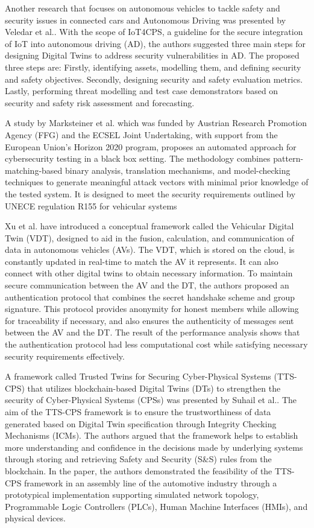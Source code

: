 Another research that focuses on autonomous vehicles to tackle safety and security issues in connected cars and Autonomous Driving was presented by Veledar et al.\cite{veledarDigitalTwinsDependability2019}.
With the scope of IoT4CPS, a guideline for the secure integration of IoT into autonomous driving (AD), the authors suggested three main steps for designing Digital Twins to address security vulnerabilities in AD. The proposed three steps are: Firstly, identifying assets, modelling them, and defining security and safety objectives. Secondly, designing security and safety evaluation metrics. Lastly, performing threat modelling and test case demonstrators based on security and safety risk assessment and forecasting.

A study by Marksteiner et al. \cite{marksteinerUsingCyberDigital2021} which was funded by Austrian Research Promotion Agency (FFG) and the ECSEL Joint Undertaking, with support from the European Union's Horizon 2020 program, proposes an automated approach for cybersecurity testing in a black box setting. The methodology combines pattern-matching-based binary analysis, translation mechanisms, and model-checking techniques to generate meaningful attack vectors with minimal prior knowledge of the tested system. It is designed to meet the security requirements outlined by UNECE regulation R155 for vehicular systems  

Xu et al.\cite{xuEfficientAuthenticationVehicular2021} have introduced a conceptual framework called the Vehicular Digital Twin (VDT), designed to aid in the fusion, calculation, and communication of data in autonomous vehicles (AVs). The VDT, which is stored on the cloud, is constantly updated in real-time to match the AV it represents. It can also connect with other digital twins to obtain necessary information. To maintain secure communication between the AV and the DT, the authors proposed an authentication protocol that combines the secret handshake scheme and group signature. This protocol provides anonymity for honest members while allowing for traceability if necessary, and also ensures the authenticity of messages sent between the AV and the DT. The result of the performance analysis shows that the authentication protocol had less computational cost while satisfying necessary security requirements effectively. 

A framework called Trusted Twins for Securing Cyber-Physical Systems (TTS-CPS) that utilizes blockchain-based Digital Twins (DTs) to strengthen the security of Cyber-Physical Systems (CPSs) was presented by Suhail et al.\cite{suhailSituationalAwareCyberphysical2022}. The aim of the TTS-CPS framework is to ensure the trustworthiness of data generated based on Digital Twin specification through Integrity Checking Mechanisms (ICMs). The authors argued that the framework helps to establish more understanding and confidence in the decisions made by underlying systems through storing and retrieving Safety and Security (S\&S) rules from the blockchain. In the paper, the authors demonstrated the feasibility of the TTS-CPS framework in an assembly line of the automotive industry through a prototypical implementation supporting simulated network topology, Programmable Logic Controllers (PLCs), Human Machine Interfaces (HMIs), and physical devices. 


